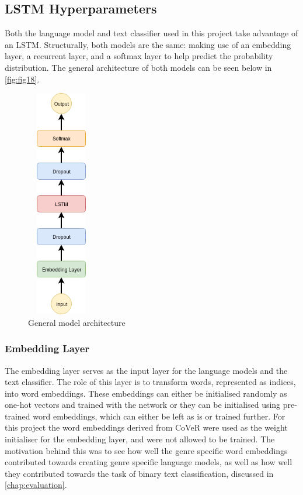 \subsection{LSTM Hyperparameters}
Both the language model and text classifier used in this project take advantage of an LSTM. Structurally, both models are the same: making use of an embedding layer, a recurrent layer, and a softmax layer to help predict the probability distribution. The general architecture of both models can be seen below in \autoref{fig:fig18}. 
\begin{figure}[h]
	\includegraphics[width=3cm, height=10cm]{./figures/fig18}
	\centering
	\caption[Model Architecture]{General model architecture}
	\label{fig:fig18}
\end{figure} 
\subsubsection{Embedding Layer}
The embedding layer serves as the input layer for the language models and the text classifier. The role of this layer is to transform words, represented as indices, into word embeddings. These embeddings can either be initialised randomly as one-hot vectors and trained with the network or they can be initialised using pre-trained word embeddings, which can either be left as is or trained further. For this project the word embeddings derived from CoVeR were used as the weight initialiser for the embedding layer, and were not allowed to be trained. The motivation behind this was to see how well the genre specific word embeddings contributed towards creating genre specific language models, as well as how well they contributed towards the task of binary text classification, discussed in \autoref{chap:evaluation}.
